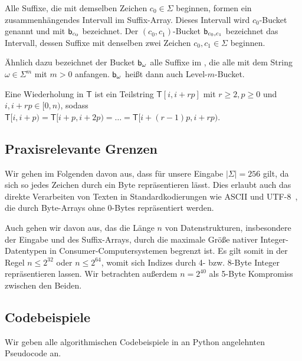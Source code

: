\begin{definition}[Bucket]
    \label{def:bucket}
    Alle Suffixe, die mit demselben Zeichen $c_0 \in \Sigma$ beginnen, formen ein zusammenhängendes Intervall im Suffix-Array.
    Dieses Intervall wird $c_0$-Bucket genannt und mit $\mathsf{b}_{c_0}$ bezeichnet.
    Der $(c_0,c_1)$-Bucket $\mathsf{b}_{c_0, c_1}$ bezeichnet das Intervall, dessen Suffixe mit denselben zwei Zeichen $c_0, c_1 \in \Sigma$ beginnen.\par
    Ähnlich dazu bezeichnet der Bucket $\mathsf{b}_{\omega}$ alle Suffixe im \sa, die alle mit dem String $\omega \in \Sigma^m$ mit \(m > 0\) anfangen. \(\mathsf{b}_{\omega}\) heißt dann auch Level-\(m\)-Bucket.
\end{definition}

\begin{definition}[Textwiederholung]
\label{def:repetition}
Eine Wiederholung in $\mathsf{T}$ ist ein Teilstring $\mathsf{T}[i, i + rp]$ mit $ r \geq 2, p \geq 0$ und $i, i + rp \in [0, n)$, sodass $\mathsf{T}[i, i+p) = \mathsf{T}[i + p, i + 2p) = \dots = \mathsf{T}[i + (r-1)p, i + rp)$.
\end{definition}

\subsection{Praxisrelevante Grenzen}

Wir gehen im Folgenden davon aus, dass für unsere Eingabe $|\Sigma| = 256$ gilt, da sich so jedes Zeichen durch ein Byte repräsentieren lässt. Dies erlaubt auch das direkte Verarbeiten von Texten in Standardkodierungen wie ASCII und UTF-8~\cite{grundlagen:utf8}, die durch Byte-Arrays ohne 0-Bytes repräsentiert werden.

Auch gehen wir davon aus, das die Länge $n$ von Datenstrukturen, insbesondere der Eingabe und des Suffix-Arrays, durch die maximale Größe nativer Integer-Datentypen in Consumer-Computersystemen begrenzt ist. Es gilt somit in der Regel $n \leq 2^{32}$ oder $n \leq 2^{64}$, womit sich Indizes durch 4- bzw. 8-Byte Integer repräsentieren lassen. Wir betrachten außerdem $n = 2^{40}$ als 5-Byte Kompromiss zwischen den Beiden.

\subsection{Codebeispiele}

Wir geben alle algorithmischen Codebeispiele in an Python angelehnten Pseudocode an. 
